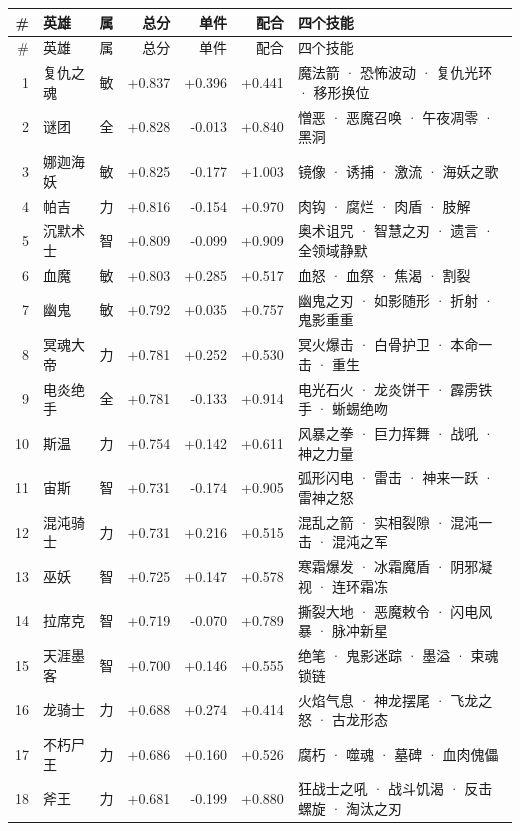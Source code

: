 \documentclass[10pt,a4paper]{article}
\begin{document}
{\footnotesize
\begin{longtable}{@{}rlcrrrp{7.6cm}@{}}
\toprule
\# & 英雄 & 属 & 总分 & 单件 & 配合 & 四个技能\\
\midrule
\endfirsthead
\toprule
\# & 英雄 & 属 & 总分 & 单件 & 配合 & 四个技能\\
\midrule
\endhead
1 & 复仇之魂 & 敏 & +0.837 & +0.396 & +0.441 & \small 魔法箭 · 恐怖波动 · 复仇光环 · 移形换位 \\
2 & 谜团 & 全 & +0.828 & -0.013 & +0.840 & \small 憎恶 · 恶魔召唤 · 午夜凋零 · 黑洞 \\
3 & 娜迦海妖 & 敏 & +0.825 & -0.177 & +1.003 & \small 镜像 · 诱捕 · 激流 · 海妖之歌 \\
4 & 帕吉 & 力 & +0.816 & -0.154 & +0.970 & \small 肉钩 · 腐烂 · 肉盾 · 肢解 \\
5 & 沉默术士 & 智 & +0.809 & -0.099 & +0.909 & \small 奥术诅咒 · 智慧之刃 · 遗言 · 全领域静默 \\
6 & 血魔 & 敏 & +0.803 & +0.285 & +0.517 & \small 血怒 · 血祭 · 焦渴 · 割裂 \\
7 & 幽鬼 & 敏 & +0.792 & +0.035 & +0.757 & \small 幽鬼之刃 · 如影随形 · 折射 · 鬼影重重 \\
8 & 冥魂大帝 & 力 & +0.781 & +0.252 & +0.530 & \small 冥火爆击 · 白骨护卫 · 本命一击 · 重生 \\
9 & 电炎绝手 & 全 & +0.781 & -0.133 & +0.914 & \small 电光石火 · 龙炎饼干 · 霹雳铁手 · 蜥蜴绝吻 \\
10 & 斯温 & 力 & +0.754 & +0.142 & +0.611 & \small 风暴之拳 · 巨力挥舞 · 战吼 · 神之力量 \\
11 & 宙斯 & 智 & +0.731 & -0.174 & +0.905 & \small 弧形闪电 · 雷击 · 神来一跃 · 雷神之怒 \\
12 & 混沌骑士 & 力 & +0.731 & +0.216 & +0.515 & \small 混乱之箭 · 实相裂隙 · 混沌一击 · 混沌之军 \\
13 & 巫妖 & 智 & +0.725 & +0.147 & +0.578 & \small 寒霜爆发 · 冰霜魔盾 · 阴邪凝视 · 连环霜冻 \\
14 & 拉席克 & 智 & +0.719 & -0.070 & +0.789 & \small 撕裂大地 · 恶魔敕令 · 闪电风暴 · 脉冲新星 \\
15 & 天涯墨客 & 智 & +0.700 & +0.146 & +0.555 & \small 绝笔 · 鬼影迷踪 · 墨溢 · 束魂锁链 \\
16 & 龙骑士 & 力 & +0.688 & +0.274 & +0.414 & \small 火焰气息 · 神龙摆尾 · 飞龙之怒 · 古龙形态 \\
17 & 不朽尸王 & 力 & +0.686 & +0.160 & +0.526 & \small 腐朽 · 噬魂 · 墓碑 · 血肉傀儡 \\
18 & 斧王 & 力 & +0.681 & -0.199 & +0.880 & \small 狂战士之吼 · 战斗饥渴 · 反击螺旋 · 淘汰之刃 \\

\end{longtable}}
\end{document}
